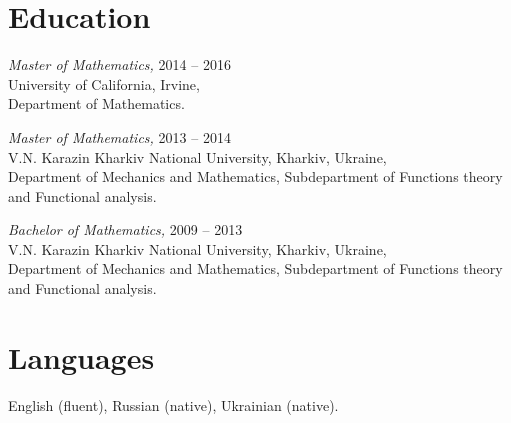 \documentclass[margin, 10pt]{res} %
\begin{document}
\begin{resume}
\section{Education}
{\sl Master of Mathematics,} \hfill 2014 --  2016\\
University of California, Irvine, \\
Department of Mathematics.

{\sl Master of Mathematics,} \hfill  2013 -- 2014\\
 V.N. Karazin Kharkiv National University, Kharkiv, Ukraine,\\
Department of Mechanics and Mathematics, Subdepartment 
of Functions theory and Functional analysis. 

{\sl Bachelor of Mathematics,} \hfill 2009 -- 2013\\ 
V.N. Karazin Kharkiv National University, Kharkiv, Ukraine,\\
Department of Mechanics and Mathematics, Subdepartment 
of Functions theory and Functional analysis.

\section{Languages}
English (fluent), Russian (native), Ukrainian (native).

\end{resume}
\end{document}

